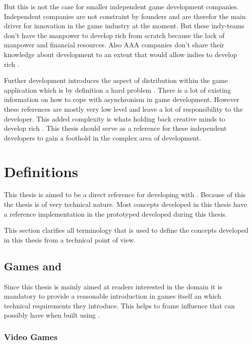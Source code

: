 But this is not the case for smaller independent game development companies.
Independent companies are not constraint by founders and are therefor the main
driver for innovation in the game industry at the moment. But these  indy-teams don't
have the manpower to develop rich \ogs{} from scratch because the lack of
manpower and financial resources. Also AAA companies don't share their knowledge
about \og{} development to an extent that would allow indies to develop rich
\ogs{}.

Further \og{} development introduces the aspect of distribution within the game
application which is by definition a hard problem . There
is a lot of existing information on how to cope with asynchronism in game
development. However these references are mostly very low
level and leave a lot of responsibility to the developer. This added complexity
is whats holding back creative minds to develop rich \ogs{}. This thesis should
serve as a reference for these independent developers to gain a foothold in the
complex area of \og{} development.

\section{Definitions}

This thesis is aimed to be a direct reference for developing \ogs{} with \mss{}.
Because of this the thesis is of very technical nature. Most concepts developed
in this thesis have a reference implementation in the prototyped developed
during this thesis. 

This section clarifies all terminology that is used to define the concepts
developed in this thesis from a technical point of view.

\subsection{Games and \ogs{}}
\label{sub:games}

Since this thesis is mainly aimed at readers interested in the \ms{} domain it
is mandatory to provide a reasonable introduction in games itself an which
technical requirements they introduce. This helps to frame influence that \ogs{}
can possibly have when built using \mss{}.

\subsubsection{Video Games}

